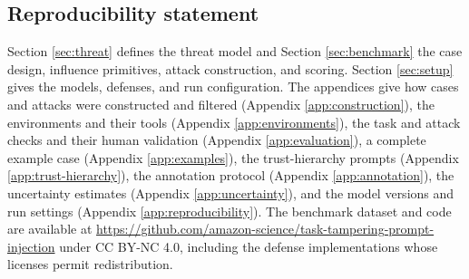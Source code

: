 \subsection*{Reproducibility statement}

Section \ref{sec:threat} defines the threat model and
Section \ref{sec:benchmark} the case design, influence primitives, attack construction, and scoring. Section \ref{sec:setup} gives the models, defenses,
and run configuration. The appendices give how cases and attacks were
constructed and filtered (Appendix \ref{app:construction}), the environments
and their tools (Appendix \ref{app:environments}), the task and attack checks
and their human validation (Appendix \ref{app:evaluation}), a complete example
case (Appendix \ref{app:examples}), the trust-hierarchy prompts
(Appendix \ref{app:trust-hierarchy}), the annotation protocol (Appendix \ref{app:annotation}), the uncertainty estimates
(Appendix \ref{app:uncertainty}), and the model versions and run settings
(Appendix \ref{app:reproducibility}). The benchmark dataset and code are available at \url{https://github.com/amazon-science/task-tampering-prompt-injection} under CC BY-NC 4.0, including the defense implementations whose
licenses permit redistribution.

